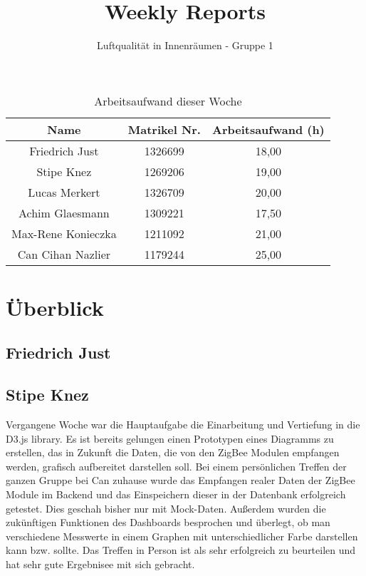 \documentclass[]{article}
\title{Weekly Reports}
\author{Luftqualität in Innenräumen - Gruppe 1}
\begin{document}
\maketitle

\begin{table}[h!]
	\centering
	\begin{tabular}{|c|c|c|}
		\hline
		{\textbf{Name}}				&		{\textbf{Matrikel Nr.}} & {\textbf{Arbeitsaufwand (h)}} \\
		\hline
		Friedrich Just				&		1326699 				&		18,00\\
		\hline
		Stipe Knez					&		1269206 				&	19,00	\\
		\hline
		Lucas Merkert				&		1326709					&	20,00	\\
		\hline
		Achim Glaesmann				&		1309221					&	17,50	\\
		\hline
		Max-Rene Konieczka			&		1211092					&	21,00	\\
		\hline
		Can Cihan Nazlier			&		1179244					&	25,00	\\
		\hline
	\end{tabular}
	\caption{Arbeitsaufwand dieser Woche}
	\label{tab:worakload}
\end{table}



\section{Überblick}


\subsection{Friedrich Just}







\subsection{Stipe Knez}
Vergangene Woche war die Hauptaufgabe die Einarbeitung und Vertiefung in die D3.js library. Es ist bereits gelungen einen Prototypen eines Diagramms zu erstellen, das in Zukunft die Daten, die von den ZigBee Modulen empfangen werden, grafisch aufbereitet darstellen soll.
Bei einem persönlichen Treffen der ganzen Gruppe bei Can zuhause wurde das Empfangen realer Daten der ZigBee Module im Backend und das Einspeichern dieser in der Datenbank erfolgreich getestet. Dies geschah bisher nur mit Mock-Daten. Außerdem wurden die zukünftigen Funktionen des Dashboards besprochen und überlegt, ob man verschiedene Messwerte in einem Graphen mit unterschiedlicher Farbe darstellen kann bzw. sollte. Das Treffen in Person ist als sehr erfolgreich zu beurteilen und hat sehr gute Ergebnisee mit sich gebracht.
\end{document}
